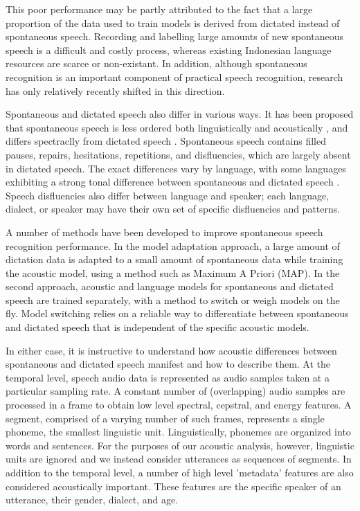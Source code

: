 \documentclass[conference]{IEEEtran}
\begin{document}
This poor performance may be partly attributed to the fact that a large proportion of the data used to train models is derived from dictated instead of spontaneous speech.
Recording and labelling large amounts of new spontaneous speech is a difficult and costly process, whereas existing Indonesian language resources are scarce or non-existant.
In addition, although spontaneous recognition is an important component of practical speech recognition, research has only relatively recently shifted in this direction.

Spontaneous and dictated speech also differ in various ways.
It has been proposed that spontaneous speech is less ordered both linguistically and acoustically \cite{nakamura1}, and differs spectraclly from dictated speech \cite{nakamura2}.
Spontaneous speech contains filled pauses, repairs, hesitations, repetitions, and disfluencies, which are largely absent in dictated speech.
The exact differences vary by language, with some languages exhibiting a strong tonal difference between spontaneous and dictated speech \cite{spanish}.
Speech disfluencies also differ between language and speaker; each language, dialect, or speaker may have their own set of specific disfluencies and patterns.

A number of methods have been developed to improve spontaneous speech recognition performance.
In the model adaptation approach, a large amount of dictation data is adapted to a small amount of spontaneous data while training the acoustic model, using a method such as Maximum A Priori (MAP).
In the second approach, acoustic and language models for spontaneous and dictated speech are trained separately, with a method to switch or weigh models on the fly.
Model switching relies on a reliable way to differentiate between spontaneous and dictated speech that is independent of the specific acoustic models.

In either case, it is instructive to understand how acoustic differences between spontaneous and dictated speech manifest and how to describe them.
At the temporal level, speech audio data is represented as audio samples taken at a particular sampling rate.
A constant number of (overlapping) audio samples are processed in a frame to obtain low level spectral, cepstral, and energy features.
A segment, comprised of a varying number of such frames, represents a single phoneme, the smallest linguistic unit.
Linguistically, phonemes are organized into words and sentences.
For the purposes of our acoustic analysis, however, linguistic units are ignored and we instead consider utterances as sequences of segments.
In addition to the temporal level, a number of high level 'metadata' features are also considered acoustically important.
These features are the specific speaker of an utterance, their gender, dialect, and age.
\end{document}
